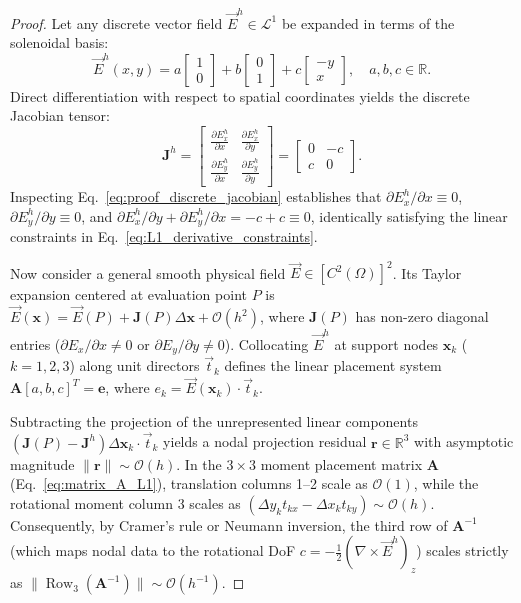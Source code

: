 \documentclass[preprint,12pt]{elsarticle}
\begin{document}
\begin{proof}
Let any discrete vector field $\vec{E}^h \in \mathcal{L}^1$ be expanded in terms of the solenoidal basis:
\begin{equation}
\vec{E}^h(x, y) = a \begin{bmatrix} 1 \\ 0 \end{bmatrix} + b \begin{bmatrix} 0 \\ 1 \end{bmatrix} + c \begin{bmatrix} -y \\ x \end{bmatrix}, \quad a, b, c \in \mathbb{R}.
\label{eq:proof_L1_expansion}
\end{equation}
Direct differentiation with respect to spatial coordinates yields the discrete Jacobian tensor:
\begin{equation}
\mathbf{J}^h = \begin{bmatrix} 
\frac{\partial E_x^h}{\partial x} & \frac{\partial E_x^h}{\partial y} \\[4pt] 
\frac{\partial E_y^h}{\partial x} & \frac{\partial E_y^h}{\partial y} 
\end{bmatrix} = \begin{bmatrix} 
0 & -c \\ 
c & 0 
\end{bmatrix}.
\label{eq:proof_discrete_jacobian}
\end{equation}
Inspecting Eq.~\eqref{eq:proof_discrete_jacobian} establishes that $\partial E_x^h/\partial x \equiv 0$, $\partial E_y^h/\partial y \equiv 0$, and $\partial E_x^h/\partial y + \partial E_y^h/\partial x = -c + c \equiv 0$, identically satisfying the linear constraints in Eq.~\eqref{eq:L1_derivative_constraints}.

Now consider a general smooth physical field $\vec{E} \in [C^2(\Omega)]^2$. Its Taylor expansion centered at evaluation point $P$ is $\vec{E}(\mathbf{x}) = \vec{E}(P) + \mathbf{J}(P) \Delta\mathbf{x} + \mathcal{O}(h^2)$, where $\mathbf{J}(P)$ has non-zero diagonal entries ($\partial E_x/\partial x \neq 0$ or $\partial E_y/\partial y \neq 0$). Collocating $\vec{E}^h$ at support nodes $\mathbf{x}_k$ ($k=1,2,3$) along unit directors $\vec{t}_k$ defines the linear placement system $\mathbf{A} [a, b, c]^T = \mathbf{e}$, where $e_k = \vec{E}(\mathbf{x}_k) \cdot \vec{t}_k$.

Subtracting the projection of the unrepresented linear components $(\mathbf{J}(P) - \mathbf{J}^h) \Delta\mathbf{x}_k \cdot \vec{t}_k$ yields a nodal projection residual $\mathbf{r} \in \mathbb{R}^3$ with asymptotic magnitude $\|\mathbf{r}\| \sim \mathcal{O}(h)$. In the $3 \times 3$ moment placement matrix $\mathbf{A}$ (Eq.~\eqref{eq:matrix_A_L1}), translation columns 1--2 scale as $\mathcal{O}(1)$, while the rotational moment column 3 scales as $(\Delta y_k t_{kx} - \Delta x_k t_{ky}) \sim \mathcal{O}(h)$. Consequently, by Cramer's rule or Neumann inversion, the third row of $\mathbf{A}^{-1}$ (which maps nodal data to the rotational DoF $c = -\frac{1}{2}(\nabla \times \vec{E}^h)_z$) scales strictly as $\|\operatorname{Row}_3(\mathbf{A}^{-1})\| \sim \mathcal{O}(h^{-1})$.


\end{proof}
\end{document}
